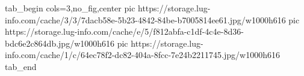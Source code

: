  
 
 
 
 


\ifcmt
  tab_begin cols=3,no_fig,center
     pic https://storage.lug-info.com/cache/3/3/7dacb58e-5b23-4842-84be-b7005814ee61.jpg/w1000h616%
		 pic https://storage.lug-info.com/cache/e/5/f812abfa-c1df-4c4e-8d36-bdc6e2c864db.jpg/w1000h616%
		 pic https://storage.lug-info.com/cache/1/c/64ec78f2-dc82-404a-8fcc-7e24b2211745.jpg/w1000h616%
  tab_end
\fi
